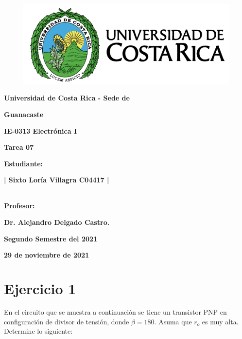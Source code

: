 \documentclass[12pt,a4paper]{article}
\author{| Sixto Loría Villagra || C04417 | \\\ \ }
\begin{document}
\begin{titlepage}
\centering

	    \begin{figure}[h!]
        \centering
        \includegraphics[scale=0.272]{UCR.png}
        \end{figure}

{\bfseries\LARGE Universidad de Costa Rica - Sede de  \par}
{\bfseries\LARGE  Guanacaste \par}
\vspace{1cm}
{\bfseries\Large IE-0313 Electrónica I \par}
\vspace{1cm}
{\bfseries\Large Tarea 07 \par}
\vspace{1cm}
{\bfseries\Large Estudiante:  \par}
{\bfseries\Large | Sixto Loría Villagra  \qquad   C04417 | \\\ \ \par}
\vspace{1cm}
{\bfseries\Large Profesor: \par}
{\bfseries\Large  Dr. Alejandro Delgado Castro.  \par}
\vfill
{\bfseries\Large Segundo Semestre del 2021 \par}
\vspace{2cm}
{\bfseries\large  29 de noviembre de 2021  \par}
\end{titlepage}


\section*{Ejercicio 1}
En el circuito que se muestra a continuación se tiene un transistor PNP en configuración de divisor de tensión, donde $\beta = 180$. Asuma que $r_o$ es muy alta. Determine lo siguiente:
\end{document}
